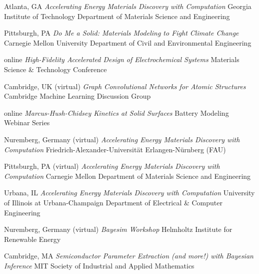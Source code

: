 \vspace{\talkyearsep}
    {Atlanta, GA}
    {\textit{Accelerating Energy Materials Discovery with Computation}}
    {Georgia Institute of Technology Department of Materials Science and Engineering}

\vspace{\talksep}
\datedsubsection{}
    {Pittsburgh, PA}
    {\textit{Do Me a Solid: Materials Modeling to Fight Climate Change}}
    {Carnegie Mellon University Department of Civil and Environmental Engineering}

\vspace{\talkyearsep}
    {online}
    {\textit{High-Fidelity Accelerated Design of Electrochemical Systems}}
    {Materials Science \& Technology Conference}

\vspace{\talksep}
\datedsubsection{}
    {Cambridge, UK (virtual)}
    {\textit{Graph Convolutional Networks for Atomic Structures}}
    {Cambridge Machine Learning Discussion Group}

\vspace{\talksep}
\datedsubsection{}
    {online}
    {\textit{Marcus-Hush-Chidsey Kinetics at Solid Surfaces}}
    {Battery Modeling Webinar Series}

\vspace{\talksep}
\datedsubsection{}
    {Nuremberg, Germany (virtual)}
    {\textit{Accelerating Energy Materials Discovery with Computation}}
    {Friedrich-Alexander-Universit\"at Erlangen-N\"urnberg (FAU)}

\vspace{\talksep}
\datedsubsection{}
    {Pittsburgh, PA (virtual)}
    {\textit{Accelerating Energy Materials Discovery with Computation}}
    {Carnegie Mellon Department of Materials Science and Engineering}

\vspace{\talksep}
\datedsubsection{}
    {Urbana, IL}
    {\textit{Accelerating Energy Materials Discovery with Computation}}
    {University of Illinois at Urbana-Champaign Department of Electrical \& Computer Engineering}

\vspace{\talkyearsep}
    {Nuremberg, Germany (virtual)}
    {\textit{Bayesim Workshop}}
    {Helmholtz Institute for Renewable Energy}

\vspace{\talksep}
    {Cambridge, MA}
    {\textit{Semiconductor Parameter Extraction (and more!) with Bayesian Inference}}
    {MIT Society of Industrial and Applied Mathematics}
